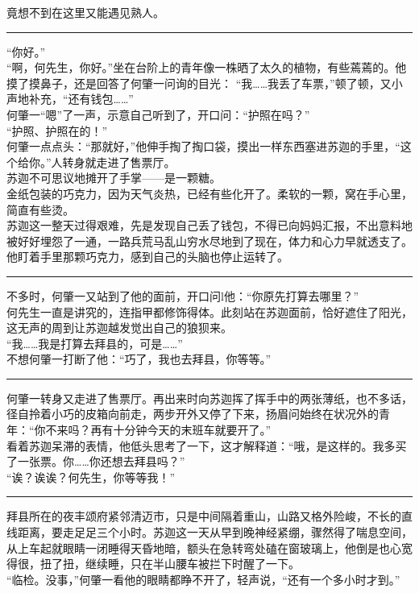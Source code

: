 \documentclass[oneside,11pt]{memoir} %
\begin{document}
\begin{CJK}{UTF8}{gbsn}
    竟想不到在这里又能遇见熟人。\\\indent
\rule{-3pt}{30pt}
    “你好。”\\\indent
    “啊，何先生，你好。”坐在台阶上的青年像一株晒了太久的植物，有些蔫蔫的。他摸了摸鼻子，还是回答了何肇一问询的目光： “我……我丢了车票，”顿了顿，又小声地补充，“还有钱包……”\\\indent
    何肇一“嗯”了一声，示意自己听到了，开口问：“护照在吗？”\\\indent
    “护照、护照在的！”\\\indent
    何肇一点点头：“那就好，”他伸手掏了掏口袋，摸出一样东西塞进苏迦的手里，“这个给你。”人转身就走进了售票厅。\\\indent
    苏迦不可思议地摊开了手掌——是一颗糖。\\\indent
    金纸包装的巧克力，因为天气炎热，已经有些化开了。柔软的一颗，窝在手心里，简直有些烫。 \\\indent               
    苏迦这一整天过得艰难，先是发现自己丢了钱包，不得已向妈妈汇报，不出意料地被好好埋怨了一通，一路兵荒马乱山穷水尽地到了现在，体力和心力早就透支了。他盯着手里那颗巧克力，感到自己的头脑也停止运转了。\\\indent
 \rule{-3pt}{30pt}   
    不多时，何肇一又站到了他的面前，开口问l他：“你原先打算去哪里？”\\\indent
    何先生一直是讲究的，连指甲都修饰得体。此刻站在苏迦面前，恰好遮住了阳光，这无声的周到让苏迦越发觉出自己的狼狈来。\\\indent
    “我……我是打算去拜县的，可是……”\\\indent
    不想何肇一打断了他：“巧了，我也去拜县，你等等。”\\\indent
\rule{-3pt}{30pt}
    何肇一转身又走进了售票厅。再出来时向苏迦挥了挥手中的两张薄纸，也不多话，径自拎着小巧的皮箱向前走，两步开外又停了下来，扬眉问始终在状况外的青年：“你不来吗？再有十分钟今天的末班车就要开了。”\\\indent
    看着苏迦呆滞的表情，他低头思考了一下，这才解释道：“哦，是这样的。我多买了一张票。你……你还想去拜县吗？”\\\indent
    “诶？诶诶？何先生，你等等我！”\\\indent
\rule{-3pt}{30pt}
    拜县所在的夜丰颂府紧邻清迈市，只是中间隔着重山，山路又格外险峻，不长的直线距离，要走足足三个小时。苏迦这一天从早到晚神经紧绷，骤然得了喘息空间，从上车起就眼睛一闭睡得天昏地暗，额头在急转弯处磕在窗玻璃上，他倒是也心宽得很，扭了扭，继续睡，只在半山腰车被拦下时醒了一下。\\\indent
    “临检。没事，”何肇一看他的眼睛都睁不开了，轻声说，“还有一个多小时才到。”\\\indent

\end{CJK}
\end{document}
